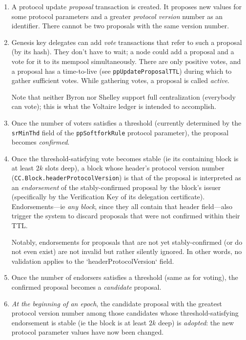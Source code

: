 \begin{enumerate}

\item
A protocol update \emph{proposal} transaction is created. It proposes new values
for some protocol parameters and a greater \emph{protocol version} number as an
identifier. There cannot be two proposals with the same version number.

\item
Genesis key delegates can add \emph{vote} transactions that refer to such a
proposal (by its hash). They don't have to wait; a node could add a proposal and
a vote for it to its mempool simultaneously. There are only positive votes, and
a proposal has a time-to-live (see \lstinline!ppUpdateProposalTTL!) during which
to gather sufficient votes. While gathering votes, a proposal is called
\emph{active}.

Note that neither Byron nor Shelley support full centralization (everybody can
vote); this is what the Voltaire ledger is intended to accomplish.

\item
Once the number of voters satisfies a threshold (currently determined by the
\lstinline!srMinThd! field of the \lstinline!ppSoftforkRule! protocol
parameter), the proposal becomes \emph{confirmed}.

\item
Once the threshold-satisfying vote becomes stable (ie its containing block is at
least $2k$ slots deep), a block whose header's protocol version number
(\lstinline!CC.Block.headerProtocolVersion!) is that of the proposal is
interpreted as an \emph{endorsement} of the stably-confirmed proposal by the
block's issuer (specifically by the Verification Key of its delegation
certificate). Endorsements---ie \emph{any block}, since they all contain that
header field---also trigger the system to discard proposals that were not
confirmed within their TTL.

Notably, endorsements for proposals that are not yet stably-confirmed (or do not
even exist) are not invalid but rather silently ignored. In other words, no
validation applies to the `headerProtocolVersion` field.

\item
Once the number of endorsers satisfies a threshold (same as for voting), the
confirmed proposal becomes a \emph{candidate} proposal.

\item
\emph{At the beginning of an epoch}, the candidate proposal with the greatest
protocol version number among those candidates whose threshold-satisfying
endorsement is stable (ie the block is at least $2k$ deep) is \emph{adopted}:
the new protocol parameter values have now been changed.


\end{enumerate}
